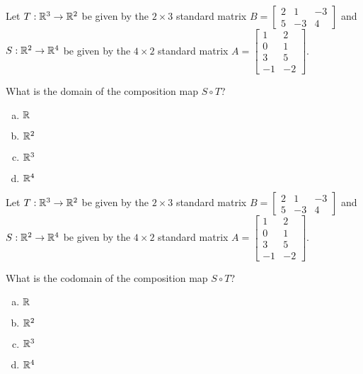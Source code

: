 \begin{activity}{5}
Let $T: \mathbb{R}^3 \rightarrow \mathbb{R}^2$ be given by the \(2\times 3\) standard matrix $B=\begin{bmatrix} 2 & 1 & -3 \\ 5 & -3 & 4 \end{bmatrix}$ and $S: \mathbb{R}^2 \rightarrow \mathbb{R}^4$ be given by the \(4\times 2\) standard matrix $A=\begin{bmatrix} 1 & 2 \\ 0 & 1 \\ 3 & 5 \\ -1 & -2 \end{bmatrix}$.

What is the domain of the composition map $S \circ T$?
\begin{enumerate}[(a)]
\item $\mathbb{R}$
\item $\mathbb{R}^2$
\item $\mathbb{R}^3$
\item $\mathbb{R}^4$
\end{enumerate}
\end{activity}

\begin{activity}{3}
Let $T: \mathbb{R}^3 \rightarrow \mathbb{R}^2$ be given by the \(2\times 3\) standard matrix $B=\begin{bmatrix} 2 & 1 & -3 \\ 5 & -3 & 4 \end{bmatrix}$ and $S: \mathbb{R}^2 \rightarrow \mathbb{R}^4$ be given by the \(4\times 2\) standard matrix $A=\begin{bmatrix} 1 & 2 \\ 0 & 1 \\ 3 & 5 \\ -1 & -2 \end{bmatrix}$.

What is the codomain of the composition map $S \circ T$?
\begin{enumerate}[(a)]
\item $\mathbb{R}$
\item $\mathbb{R}^2$
\item $\mathbb{R}^3$
\item $\mathbb{R}^4$
\end{enumerate}
\end{activity}

